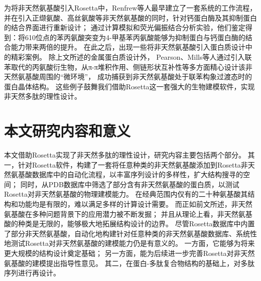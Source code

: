 为将非天然氨基酸引入Rosetta中，Renfrew等人最早建立了一套系统的工作流程，
并在引入正缬氨酸、高丝氨酸等非天然氨基酸的同时，针对钙蛋白酶及其抑制蛋白的结合界面进行重新设计；
通过计算模拟和荧光偏振结合分析实验，他们鉴定得到：将610位点的苯丙氨酸突变为4-甲基苯丙氨酸能够为抑制蛋白与钙蛋白酶的结合能力带来两倍的提升。
在此之后，出现一些将非天然氨基酸引入蛋白质设计中的精彩案例。
除上文所述的金属蛋白质设计外，
Pearson、Mills等人通过引入联苯取代的丙氨酸衍生物，从π-π堆积作用、侧链形状互补性等多方面精心设计该非天然氨基酸周围的“微环境”，
成功捕获到非天然氨基酸处于联苯构象过渡态时的蛋白晶体结构。
这些例子鼓舞我们借助Rosetta这一套强大的生物建模软件，实现非天然多肽的理性设计。



\section{本文研究内容和意义}

本文借助Rosetta实现了非天然多肽的理性设计，研究内容主要包括两个部分。
其一，针对Rosetta软件，构建了一套将任意种类的非天然氨基酸添加到Rosetta非天然氨基酸数据库中的自动化流程，以丰富序列设计的多样性，扩大结构搜寻的空间；
同时，从PDB数据库中筛选了部分含有非天然氨基酸的蛋白质，以测试Rosetta对非天然氨基酸的物理建模能力。
在经典范围内仅有的二十种氨基酸其结构和功能均是有限的，难以满足多样的计算设计需要。
而正如前文所述，非天然氨基酸在多种问题背景下的应用潜力被不断发掘；
并且从理论上看，非天然氨基酸的种类是无限的，能够极大地拓展结构设计的边界。
尽管Rosetta数据库中内置了部分非天然氨基酸，自动化地构建针对任意种类的非天然氨基酸数据库、系统性地测试Rosetta对非天然氨基酸的建模能力仍是有意义的。
一方面，它能够为将来更大规模的结构设计奠定基础；
另一方面，能为后续进一步完善Rosetta对非天然氨基酸的建模提出指导性意见。
其二，在蛋白-多肽复合物结构的基础上，对多肽序列进行再设计。


